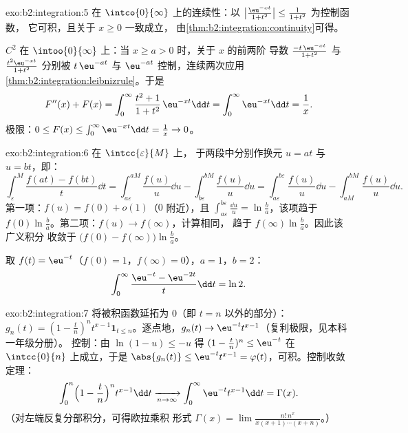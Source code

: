 \begin{solution}{exo:b2:integration:5}
在 $\intco{0}{\infty}$ 上的连续性：以
$\bigl|\frac{\eu^{-xt}}{1+t^2}\bigr| \leq \frac{1}{1+t^2}$ 为控制函数，
它可积，且关于 $x \geq 0$ 一致成立，
由\cref{thm:b2:integration:continuity}可得。

$C^2$ 在 $\intoo{0}{\infty}$ 上：当 $x \geq a > 0$ 时，关于 $x$ 的前两阶
导数 $\frac{-t\,\eu^{-xt}}{1+t^2}$ 与
$\frac{t^2\eu^{-xt}}{1+t^2}$ 分别被 $t\,\eu^{-at}$ 与
$\eu^{-at}$ 控制，连续两次应用
\cref{thm:b2:integration:leibnizrule}。于是
\[
F''(x) + F(x) = \int_0^\infty \frac{t^2 + 1}{1 + t^2}\,\eu^{-xt}\dd
t = \int_0^\infty \eu^{-xt}\dd t = \frac1x .
\]
极限：$0 \leq F(x) \leq \int_0^\infty \eu^{-xt}\dd t = \frac1x \to
0$。
\end{solution}

\begin{solution}{exo:b2:integration:6}
在 $\intcc{\varepsilon}{M}$ 上，
于两段中分别作换元 $u = at$ 与 $u = bt$，即：
\[
\int_\varepsilon^M \frac{f(at) - f(bt)}{t}\dd t
= \int_{a\varepsilon}^{aM}\frac{f(u)}{u}\dd u
- \int_{b\varepsilon}^{bM}\frac{f(u)}{u}\dd u
= \int_{a\varepsilon}^{b\varepsilon} \frac{f(u)}{u}\dd u
- \int_{aM}^{bM} \frac{f(u)}{u}\dd u .
\]
第一项：$f(u) = f(0) + o(1)$（$0$ 附近），且 $\int_{a\varepsilon}
^{b\varepsilon} \frac{\dd u}{u} = \ln\frac ba$，该项趋于
$f(0)\ln\frac ba$。第二项：$f(u) \to f(\infty)$，计算相同，
趋于 $f(\infty)\ln\frac ba$。因此该广义积分
收敛于 $\bigl(f(0) - f(\infty)\bigr)\ln\frac ba$。

取 $f(t) = \eu^{-t}$（$f(0) = 1$，$f(\infty) = 0$），$a = 1$，$b
= 2$：
\[
\int_0^\infty \frac{\eu^{-t} - \eu^{-2t}}{t}\dd t = \ln 2 .
\]
\end{solution}

\begin{solution}{exo:b2:integration:7}
将被积函数延拓为 $0$（即 $t = n$ 以外的部分）：$g_n(t) = (1 -
\frac tn)^n t^{x-1}\mathbf{1}_{t \leq n}$。逐点地，$g_n(t) \to
\eu^{-t}t^{x-1}$（复利极限，见本科一年级分册）。
控制：由 $\ln(1 - u) \leq -u$ 得 $(1 - \frac tn)^n \leq
\eu^{-t}$ 在 $\intcc{0}{n}$ 上成立，于是 $\abs{g_n(t)} \leq
\eu^{-t}t^{x-1} = \varphi(t)$，可积。控制收敛定理：
\[
\int_0^n \Bigl(1 - \frac tn\Bigr)^n t^{x-1}\dd t
\xrightarrow[n\to\infty]{} \int_0^\infty \eu^{-t}t^{x-1}\dd t
= \Gamma(x) .
\]
（对左端反复分部积分，可得欧拉乘积
形式 $\Gamma(x) = \lim \frac{n!\,n^x}{x(x+1)\cdots(x+n)}$。）
\end{solution}

